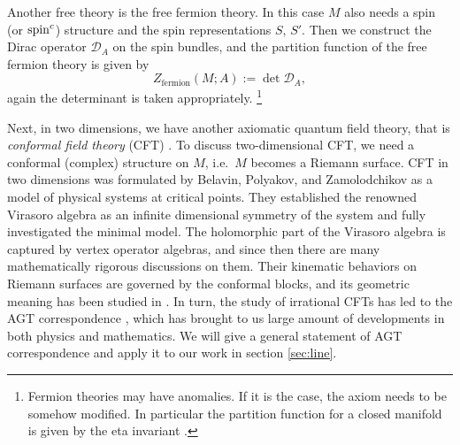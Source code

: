 Another free theory is the free fermion theory. In this case $M$
also needs a spin (or ${\rm spin}^c$) structure and the spin representations $S$, $S'$.
Then we construct the Dirac operator $\mathcal{D}_{A}$ on the spin
bundles, and the partition function of the free fermion theory is given
by
\begin{equation}
Z_{\mathrm{fermion}}(M;A):=\det\mathcal{D}_{A},
\end{equation}
again the determinant is taken appropriately.%
%
\footnote{Fermion theories may have anomalies. If it is the case, the axiom
needs to be somehow modified. In particular the partition function
for a closed manifold is given by the eta invariant \cite{Dai:1994kq}.}

Next, in two dimensions, we have another axiomatic quantum field theory,
that is \emph{conformal field theory} (CFT) \cite{Segal:2002ei}.
To discuss two-dimensional CFT, we need a conformal (complex) structure
on $M$, i.e.~$M$ becomes a Riemann surface. CFT in two dimensions was formulated by Belavin, Polyakov,
and Zamolodchikov \cite{Belavin:1984vu} as a model of physical systems at critical
points. They established the renowned Virasoro algebra as an infinite
dimensional symmetry of the system and fully investigated the minimal
model. The holomorphic part of the Virasoro algebra is captured by
vertex operator algebras, and since then there are many mathematically
rigorous discussions on them. Their kinematic behaviors on Riemann
surfaces are governed by the conformal blocks, and its geometric meaning
has been studied in \cite{Friedan:1986ua}. In turn, the study of irrational
CFTs \cite{Teschner:2001rv,Nakayama:2004vk} has led to the AGT correspondence \cite{Alday:2009aq}, which has brought
to us large amount of developments in both physics and mathematics.
We will give a general statement of AGT correspondence and apply it to our work
in section \ref{sec:line}.

